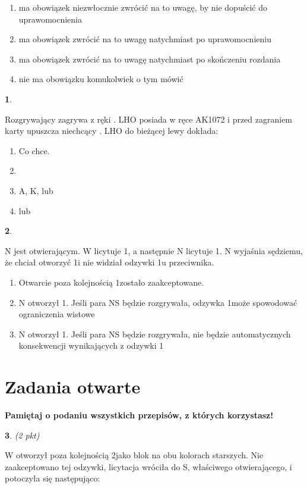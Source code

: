 \documentclass[12pt, a4paper]{article}
\newtheorem{pyt}{}
\begin{document}
\begin{enumerate}[label=\alph*.]
\item ma obowiązek niezwłocznie zwrócić na to uwagę, by nie dopuścić do uprawomocnienia
\item ma obowiązek zwrócić na to uwagę natychmiast po uprawomocnieniu
\item ma obowiązek zwrócić na to uwagę natychmiast po skończeniu rozdania
\item nie ma obowiązku komukolwiek o tym mówić 
\end{enumerate}


\begin{pyt} 
\end{pyt}
Rozgrywający zagrywa z ręki . LHO posiada w ręce \xspades AK1072 i przed zagraniem karty
upuszcza niechcący . LHO do bieżącej lewy dokłada:
\begin{enumerate}[label=\alph*.]
\item Co chce.
\item {}
\item \xspades A, \xspades K,  lub 
\item {} lub 
\end{enumerate}

\begin{pyt} 
\end{pyt}
N jest otwierającym. W licytuje 1\diams, a następnie N licytuje 1\hearts. N wyjaśnia sędziemu, że chciał
otworzyć 1\hearts i nie widział odzywki 1\diams u przeciwnika.
\begin{enumerate}[label=\alph*.]
\item Otwarcie poza kolejnością 1\diams zostało zaakceptowane.
\item N otworzył 1\hearts. Jeśli para NS będzie rozgrywała, odzywka 1\diams może spowodować ograniczenia wistowe
\item N otworzył 1\hearts. Jeśli para NS będzie rozgrywała, nie będzie automatycznych konsekwencji wynikających z odzywki 1\diams
\end{enumerate}

\section*{Zadania otwarte}
\textbf{Pamiętaj o podaniu wszystkich przepisów, z których korzystasz!}
\begin{pyt} (2 pkt)
\end{pyt}
W otworzył poza kolejnością 2\clubs jako blok na obu kolorach starszych. Nie zaakceptowano tej
odzywki, licytacja wróciła do S, właściwego otwierającego, i potoczyła się następująco:
\end{document}
